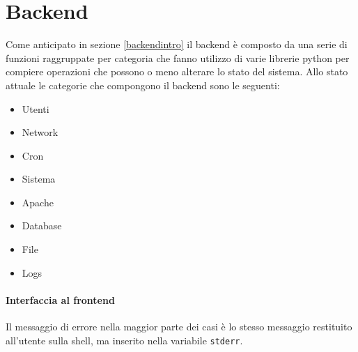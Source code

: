 \documentclass[11pt]{article}
\begin{document}
\section{Backend}\label{backend}
Come anticipato in sezione \ref{backendintro} il backend è composto da una serie di funzioni raggruppate per categoria
che fanno utilizzo di varie librerie python per compiere operazioni che possono o meno alterare lo stato del sistema.
Allo stato attuale le categorie che compongono il backend sono le seguenti:
\begin{itemize}
	\item{Utenti}
	\item{Network}
	\item{Cron}
	\item{Sistema}
	\item{Apache}
	\item{Database}
	\item{File}
	\item{Logs}
\end{itemize}

\paragraph{Interfaccia al frontend}
Il messaggio di errore nella maggior parte dei casi è lo stesso messaggio restituito all'utente sulla shell,
ma inserito nella variabile \texttt{stderr}.
\end{document}
